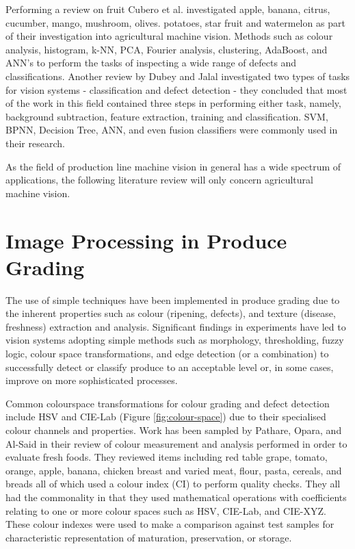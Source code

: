 \documentclass[fleqn,twoside,12pt]{report}
\begin{document}
Performing a review on fruit Cubero et al.\cite{cubero} investigated apple, banana, citrus, cucumber, mango, mushroom, olives. potatoes, star fruit and watermelon as part of their investigation into agricultural machine vision. Methods such as colour analysis, histogram, k-NN, PCA, Fourier analysis, clustering, AdaBoost, and ANN's to perform the tasks of inspecting a wide range of defects and classifications. Another review by Dubey and Jalal \cite{dubey} investigated two types of tasks for vision systems - classification and defect detection - they concluded that most of the work in this field contained three steps in performing either task, namely, background subtraction, feature extraction, training and classification. SVM, BPNN, Decision Tree, ANN, and even fusion classifiers were commonly used in their research.

As the field of production line machine vision in general has a wide spectrum of applications, the following literature review will only concern agricultural machine vision. 


\section{Image Processing in Produce Grading}

 
The use of simple techniques have been implemented in produce grading due to the inherent properties such as colour (ripening, defects), and texture (disease, freshness) extraction and analysis. Significant findings in experiments have led to vision systems adopting simple methods such as morphology, thresholding, fuzzy logic, colour space transformations, and edge detection (or a combination) to successfully detect or classify produce to an acceptable level or, in some cases, improve on more sophisticated processes.

Common colourspace transformations for colour grading and defect detection include HSV and CIE-Lab (Figure \ref{fig:colour-space}) due to their specialised colour channels and properties. Work has been sampled by Pathare, Opara, and Al-Said \cite{pathare} in their review of colour measurement and analysis performed in order to evaluate fresh foods. They reviewed items including red table grape, tomato, orange, apple, banana, chicken breast and varied meat, flour, pasta, cereals, and breads all of which used a colour index (CI) to perform quality checks. They all had the commonality in that they used mathematical operations with coefficients relating to one or more colour spaces such as HSV, CIE-Lab, and CIE-XYZ. These colour indexes were used to make a comparison against test samples for characteristic representation of maturation, preservation, or storage. 
\end{document}
